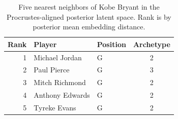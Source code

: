 \begin{table}[htbp]
  \centering\small
  \begin{tabular}{rllc}
    \toprule
    Rank & Player & Position & Archetype \\
    \midrule
    1 & Michael Jordan & G & 2 \\
    2 & Paul Pierce & G & 3 \\
    3 & Mitch Richmond & G & 2 \\
    4 & Anthony Edwards & G & 2 \\
    5 & Tyreke Evans & G & 2 \\
    \bottomrule
  \end{tabular}
  \caption{Five nearest neighbors of Kobe Bryant in the Procrustes-aligned posterior latent space. Rank is by posterior mean embedding distance.}
  \label{tab:Kobe_Bryant_neighbors}
\end{table}

